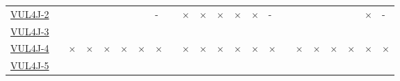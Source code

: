 \begin{table}[!htbp]
{\begin{tabular}{|l|lll|ll|ll||lll|ll|ll||lll|ll|ll|}
		\href{https://github.com/apache/xmlgraphics-batik/commit/660ef628d637af636ea113243fe73f170ac43958}{VUL4J-2} & \cellcolor{green}\checkmark & \cellcolor{green}\checkmark & \cellcolor{green}\checkmark & \cellcolor{green}\checkmark & \cellcolor{green}\checkmark & \cellcolor{green}\checkmark & \cellcolor{lightgray}-  & \cellcolor{green}\checkmark & \cellcolor{red}$\times$ & \cellcolor{red}$\times$ & \cellcolor{red}$\times$ & \cellcolor{red}$\times$ & \cellcolor{red}$\times$ & \cellcolor{lightgray}-     & \cellcolor{green}\checkmark & \cellcolor{yellow}\halfcheckmark & \cellcolor{green}\checkmark & 
		\cellcolor{yellow}\halfcheckmark & \cellcolor{green}\checkmark & \cellcolor{red}$\times$ & \cellcolor{lightgray}-\\ 
		\href{https://github.com/apache/camel/commit/7d19340bcdb42f7aae584d9c5003ac4f7ddaee36}{VUL4J-3} & \cellcolor{green}\checkmark & \cellcolor{green}\checkmark & \cellcolor{green}\checkmark & \cellcolor{green}\checkmark & \cellcolor{green}\checkmark & \cellcolor{green}\checkmark & \cellcolor{green}\checkmark  & \cellcolor{green}\checkmark & \cellcolor{green}\checkmark & \cellcolor{green}\checkmark & \cellcolor{green}\checkmark & \cellcolor{green}\checkmark & \cellcolor{green}\checkmark & \cellcolor{green}\checkmark     & \cellcolor{green}\checkmark & \cellcolor{green}\checkmark & \cellcolor{green}\checkmark & \cellcolor{green}\checkmark & \cellcolor{green}\checkmark & \cellcolor{green}\checkmark & \cellcolor{green}\checkmark\\ 
		\href{https://github.com/apache/camel/commit/1df559649a96a1ca0368373387e542f46e4820da}{VUL4J-4} & \cellcolor{green}\checkmark & \cellcolor{red}$\times$ & \cellcolor{red}$\times$ & \cellcolor{red}$\times$ & \cellcolor{red}$\times$ & \cellcolor{red}$\times$ & \cellcolor{red}$\times$  & \cellcolor{green}\checkmark & \cellcolor{red}$\times$ & \cellcolor{red}$\times$ & \cellcolor{red}$\times$ & \cellcolor{red}$\times$ & \cellcolor{red}$\times$ & \cellcolor{red}$\times$     & \cellcolor{green}\checkmark & \cellcolor{red}$\times$ & \cellcolor{red}$\times$ & \cellcolor{red}$\times$ & \cellcolor{red}$\times$ & \cellcolor{red}$\times$ & \cellcolor{red}$\times$\\ 
		\href{https://github.com/apache/commons-compress/commit/a080293da69f3fe3d11d5214432e1469ee195870}{VUL4J-5} & \cellcolor{green}\checkmark & \cellcolor{green}\checkmark & \cellcolor{green}\checkmark & \cellcolor{green}\checkmark & \cellcolor{green}\checkmark & \cellcolor{green}\checkmark & \cellcolor{green}\checkmark  & \cellcolor{green}\checkmark & \cellcolor{green}\checkmark & \cellcolor{green}\checkmark & \cellcolor{green}\checkmark & \cellcolor{green}\checkmark & \cellcolor{green}\checkmark & \cellcolor{green}\checkmark     & \cellcolor{green}\checkmark & \cellcolor{yellow}\halfcheckmark & \cellcolor{green}\checkmark & \cellcolor{green}\checkmark & \cellcolor{green}\checkmark & \cellcolor{green}\checkmark & \cellcolor{green}\checkmark\\ 

\end{tabular}}
\end{table}
